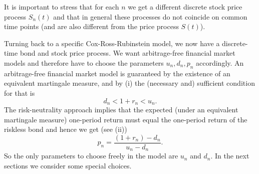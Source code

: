 It is important to stress that for each $n$ we get a different discrete stock price process $S_n(t)$ and that in general these processes do not coincide on common time points (and are also different from the price process $S(t)$).

Turning back to a specific Cox-Ross-Rubinstein model, we now have a discrete-time bond and stock price process. We want arbitrage-free financial market models and therefore have to choose the parameters $u_n, d_n, p_n$ accordingly. An arbitrage-free financial market model is guaranteed by the existence of an equivalent martingale measure, and by (i) the (necessary and) sufficient condition for that is
\[
	d_n < 1 + r_n < u_n.
\]
The risk-neutrality approach implies that the expected (under an equivalent martingale measure) one-period return must equal the one-period return of the riskless bond and hence we get (see (ii))
\begin{equation} \label{eq:RiskNeutralProb}
	p_n = \frac{(1+r_n) - d_n}{u_n - d_n}.
\end{equation}
So the only parameters to choose freely in the model are $u_n$ and $d_n$. In the next sections we consider some special choices.

